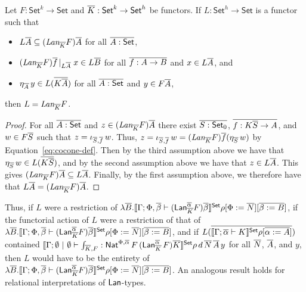 \documentclass{lmcs}
\theoremstyle{plain}\newtheorem{satz}[thm]{Satz}
\newcommand{\set}{\mathsf{Set}}
\begin{document}
\begin{prop}\label{prop:full-lan}
Let $F : \set^k \to \set$ and $\ol K : \set^k \to \set^h$ be functors.
If $L : \set^h \to \set$ is a functor such that 
\begin{itemize}
\item $L \overline{A} \subseteq
  (\textit{Lan}_{\overline{K}} F)\overline{A}$ for all $\ol{A : \set}$,
\item $(\textit{Lan}_{\overline{K}} F)\overline{f}\,|_{L \overline{A}}\; x \in L
  \overline{B}$ for all $\overline{f : A \to B}$ and $x \in L \overline{A}$, and 
\item $\eta_{\overline{A}}\, y \in L ( \overline{K \overline{A}} )$ for all $\ol{A :
  \set}$ and $y \in F \overline{A}$, 
\end{itemize}
then $L = \textit{Lan}_{\overline{K}} F$.
\end{prop}
\begin{proof}
For all $\ol{A : \set}$ and $z \in (\textit{Lan}_{\overline{K}} F)\overline{A}$
there exist $\ol{S : \set_0}$, $\overline{f : K \overline{S} \to A}$, and $w \in F
\overline{S}$ such that $z = \iota_{\overline{S}, \overline{f}}\, w$.  Thus, $z =
\iota_{\overline{S}, \overline{f}}\, w = (\textit{Lan}_{\overline{K}} F) \overline{f}
(\eta_{\overline{S}} \,w)$ by Equation~\ref{eq:cocone-def}. Then by the
third assumption above we have that $\eta_{\overline{S}}\, w \in L (\overline{K
  \overline{S}})$, and by the second assumption above we have that $z \in L
\overline{A}$. This gives $(\textit{Lan}_{\overline{K}} F)\overline{A} \subseteq L \overline{A}$. Finally, by the first assumption above, we therefore have that $L
\overline{A} = (\textit{Lan}_{\overline{K}} F)\overline{A}$.
\end{proof}
Thus, if $L$ were a restriction of $\lambda \ol B. \setsem{\Gamma; \Phi,\ol\beta
  \vdash (\Lan^{\ol\alpha}_{\ol K} F){\ol \beta}}\rho[\Phi := \ol
  N][\ol{\beta := B}]$,
if the functorial 
action of $L$ were a restriction of that of $\lambda \ol B. \setsem{\Gamma;
  \Phi,\ol\beta \vdash (\Lan^{\ol\alpha}_{\ol K} F){\ol
    \beta}}\rho[\Phi := \ol N][\ol{\beta := B}]$, and if
$L(\ol{\setsem{\Gamma;\ol\alpha \vdash K}\rho[\ol{\alpha := A}]})$ 
contained $\setsem{\Gamma;\emptyset~|~\emptyset \vdash \int_{\ol
    K,F} : \Nat^{\Phi, \ol\alpha}\, F\, (\Lan^{\ol\alpha}_{\ol{K}}\,
  F) \ol{K}}\rho\,d\,\ol N\,\ol A\,y$ for all $\overline{N}$, $\overline{A}$, and
$y$, then $L$ would have to be the entirety of
 $\lambda \ol B. \setsem{\Gamma; \Phi,\ol\beta
  \vdash (\Lan^{\ol\alpha}_{\ol K} F){\ol \beta}}\rho[\Phi := \ol
  N][\ol{\beta := B}]$.
An analogous result holds for relational
interpretations of $\mathsf{Lan}$-types.
\end{document}
